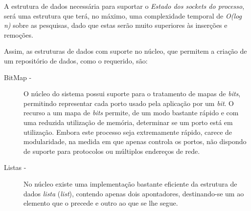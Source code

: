 A estrutura de dados necessária para suportar o \textit{Estado dos sockets do processo}, será uma estrutura que terá, no máximo, uma complexidade temporal de \textit{O(log n)} sobre as pesquisas, dado que estas serão muito superiores às inserções e remoções.

Assim, as estruturas de dados com suporte no núcleo, que permitem a criação de um repositório de dados, como o requerido, são:


\begin{description}

\item[BitMap - ]

O núcleo do sistema possui suporte para o tratamento de mapas de \textit{bits}, permitindo representar cada porto usado pela aplicação por um \textit{bit}.
O recurso a um mapa de \textit{bits} permite, de um modo bastante rápido e com uma reduzida utilização de memória, determinar se um porto está em utilização.
Embora este processo seja extremamente rápido, carece de modularidade, na medida em que apenas controla os portos, não dispondo de suporte para protocolos ou múltiplos endereços de rede.

 



\item[Listas - ]

No núcleo existe uma implementação bastante eficiente da estrutura de dados \emph{lista} (\emph{list}), contendo apenas dois apontadores, destinando-se um ao elemento que o precede e outro ao que se lhe segue.


\end{description}
